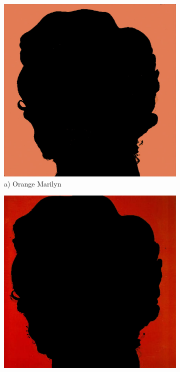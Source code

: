 \documentclass{article}
\begin{document}
\begin{figure}[htbp]
    \centering
    \begin{subfigure}[b]{0.19\textwidth}
        \includegraphics[width=\textwidth]{main_files/figure-latex/8_1_orange_marilyn_background_extraction.jpg}
        \caption*{a) Orange Marilyn}
    \end{subfigure}
    \hfill
    \begin{subfigure}[b]{0.19\textwidth}
        \includegraphics[width=\textwidth]{main_files/figure-latex/9_1_red_marilyn_background_extraction.jpg}

\end{subfigure}
\end{figure}
\end{document}
